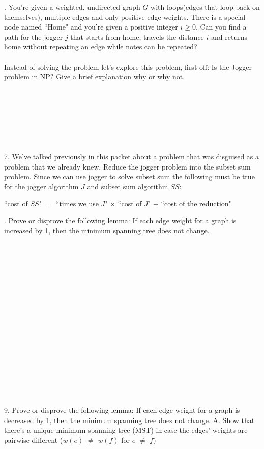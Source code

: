 \documentclass[12pt]{article}
\begin{document}
. You're given a weighted, undirected graph $G$ with loops(edges that loop back on themselves), 
 multiple edges and only positive edge weights. There is a special node named ``Home" and you're given a positive integer $i \geq 0$.
 Can you find a path for the jogger $j$ that starts from home, travels the distance $i$ and returns home without repeating an edge while notes can be repeated?
 \\\\Instead of solving the problem let's explore this problem, first off: Is the Jogger problem in NP? Give a brief explanation why or why not.\\\\\\\\\\\\\\\\
 7. We've talked previously in this packet about a problem that was disguised as a problem that we already knew. Reduce the jogger problem into the subset sum problem. 
 Since we can use jogger to solve subset sum the following must be true for the jogger algorithm $J$ and subset sum algorithm $SS$: \\
 \centerline{``cost of $SS$" $=$ ``times we use $J$" $\times$ ``cost of $J$" $+$ ``cost of the reduction"} 
\newpage 
{}. Prove or disprove the following lemma: If each edge weight for a graph is increased by 1, then the minimum spanning tree does not change.\\\\\\\\\\\\\\\\\\\\\\\\\\\\\\\\\\\\
9. Prove or disprove the following lemma: If each edge weight for a graph is decreased by 1, then the minimum spanning tree does not change.
\newpage
\noindent A. Show that there's a unique minimum spanning tree (MST) in case the edges' weights are pairwise different ($w(e)$ $\neq$ $w(f)$ for $e$ $\neq$ $f$)\\\\
\end{document}
